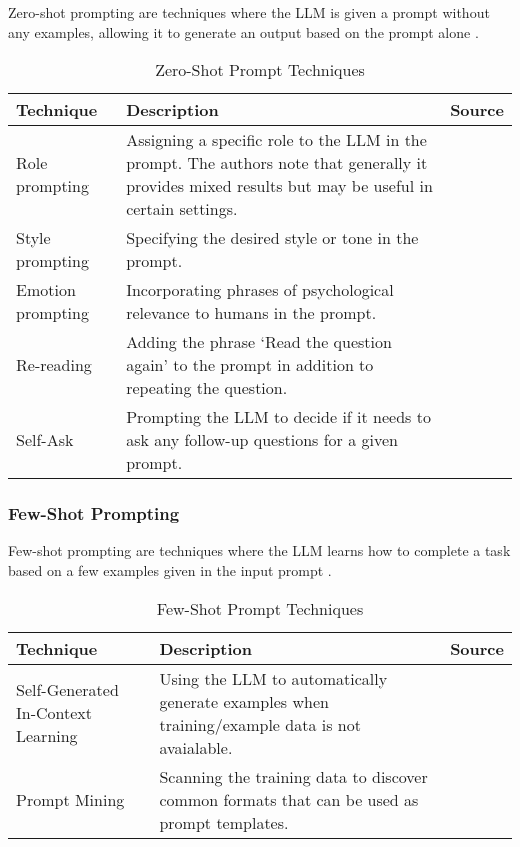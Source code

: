 Zero-shot prompting are techniques where the LLM is given a prompt without any examples, allowing it to generate an output based on the prompt alone \parencite{prompt1}.

\begin{table}[h!]
    \centering
    \begin{tabular}{p{3cm} p{8cm} p{2cm}}
        \toprule
        \textbf{Technique} & \textbf{Description} & \textbf{Source} \\
        \midrule
        \raggedright
        Role prompting & Assigning a specific role to the LLM in the prompt. The authors note that generally it provides mixed results but may be useful in certain settings.  & \textcite{role1} \\
        \hline
        \raggedright
        Style prompting & Specifying the desired style or tone in the prompt. & \textcite{style} \\
        \hline
        \raggedright
        Emotion prompting & Incorporating phrases of psychological relevance to humans in the prompt. & \textcite{emotion} \\
        \hline
        \raggedright
        Re-reading & Adding the phrase `Read the question again' to the prompt in addition to repeating the question. & \textcite{rereading} \\
        \hline
        \raggedright
        Self-Ask & Prompting the LLM to decide if it needs to ask any follow-up questions for a given prompt. &  \textcite{selfask} \\
        \bottomrule
    \end{tabular}
    \caption{Zero-Shot Prompt Techniques}
    \label{tab:zero_shot}
\end{table}

\FloatBarrier

\subsubsection{Few-Shot Prompting}

Few-shot prompting are techniques where the LLM learns how to complete a task based on a few examples given in the input prompt \parencite{prompt1}.

\begin{table}[h!]
    \centering
    \begin{tabular}{p{3cm} p{8cm} p{2cm}}
        \toprule
        \textbf{Technique} & \textbf{Description} & \textbf{Source} \\
        \midrule
        \raggedright
        Self-Generated In-Context Learning & Using the LLM to automatically generate examples when training/example data is not avaialable. & \textcite{self-generating} \\
        \hline
        \raggedright
        Prompt Mining & Scanning the training data to discover common formats that can be used as prompt templates. & \textcite{mining} \\
        \bottomrule
    \end{tabular}
    \caption{Few-Shot Prompt Techniques}
    \label{tab:few_shot}
\end{table}


